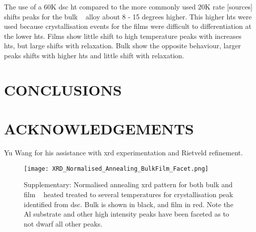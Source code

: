 \documentclass[a4paper,12pt,oneside]{article}%
\begin{document}
The use of a 60K \gls{dsc} \acrfull{ht} compared to the more commonly used 20K rate [sources] shifts peaks for the bulk \MgZnCa~ alloy about 8 - 15 degrees higher. This higher \glspl{ht} were used because crystallisation events for the films were difficult to differentiation at the lower \glspl{ht}. 
Films show little shift to high temperature peaks with increases \glspl{ht}, but large shifts with relaxation. 
Bulk show the opposite behaviour, larger peaks shifts with higher \glspl{ht} and little shift with relaxation.


\section{CONCLUSIONS}


\section{ACKNOWLEDGEMENTS}

Yu Wang for his assistance with \acrshort{xrd} experimentation and Rietveld refinement. 







\begin{figure}[b]
	\centering
	\texttt{[image: XRD\_Normalised\_Annealing\_BulkFilm\_Facet.png]}
	\caption{Supplementary: Normalised annealing \acrshort{xrd} pattern for both bulk and film \MgZnCa~ heated treated to several temperatures for crystallisation peak identified from \acrshort{dsc}. Bulk is shown in black, and film in red. Note the Al substrate and other high intensity peaks have been faceted as to not dwarf all other peaks.}
	\label{fig:XRD_Annealing_BulkandFilm}
\end{figure}
\end{document}
